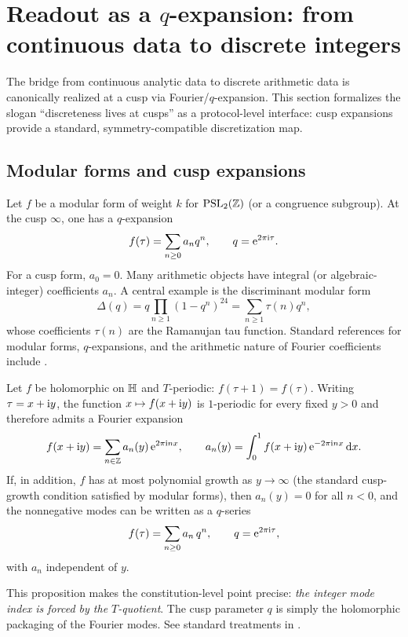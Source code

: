 \section{Readout as a \texorpdfstring{$q$}{q}-expansion: from continuous data to discrete integers}
\label{sec:readout_as_q_expansion}

The bridge from continuous analytic data to discrete arithmetic data is canonically realized at a cusp via Fourier/$q$-expansion. This section formalizes the slogan ``discreteness lives at cusps'' as a protocol-level interface: cusp expansions provide a standard, symmetry-compatible discretization map.

\subsection{Modular forms and cusp expansions}
\label{sec:modular_forms_qexp}

Let $f$ be a modular form of weight $k$ for $\mathrm{PSL}_2(\mathbb{Z})$ (or a congruence subgroup). At the cusp $\infty$, one has a $q$-expansion
\begin{equation}
f(\tau)=\sum_{n\ge 0} a_n q^n,\qquad q=\mathrm{e}^{2\pi \mathrm{i} \tau}.
\end{equation}
For a cusp form, $a_0=0$. Many arithmetic objects have integral (or algebraic-integer) coefficients $a_n$. A central example is the discriminant modular form
\begin{equation}
\Delta(q)=q\prod_{n\ge 1}(1-q^n)^{24}=\sum_{n\ge 1}\tau(n)q^n,
\end{equation}
whose coefficients $\tau(n)$ are the Ramanujan tau function.
Standard references for modular forms, $q$-expansions, and the arithmetic nature of Fourier coefficients include \cite{Serre1973,Apostol1990,DiamondShurman2005}.

\begin{proposition}
\label{prop:qexp_from_T_periodicity}
Let $f$ be holomorphic on $\mathbb{H}$ and $T$-periodic: $f(\tau+1)=f(\tau)$. Writing $\tau=x+\mathrm{i} y$, the function $x\mapsto f(x+\mathrm{i} y)$ is $1$-periodic for every fixed $y>0$ and therefore admits a Fourier expansion
\begin{equation}
f(x+\mathrm{i} y)=\sum_{n\in\mathbb{Z}} a_n(y)\,\mathrm{e}^{2\pi \mathrm{i} n x},
\qquad
a_n(y)=\int_0^1 f(x+\mathrm{i} y)\,\mathrm{e}^{-2\pi \mathrm{i} n x}\,\mathrm{d} x.
\end{equation}
If, in addition, $f$ has at most polynomial growth as $y\to\infty$ (the standard cusp-growth condition satisfied by modular forms), then $a_n(y)=0$ for all $n<0$, and the nonnegative modes can be written as a $q$-series
\begin{equation}
f(\tau)=\sum_{n\ge 0} a_n\,q^n,
\qquad q=\mathrm{e}^{2\pi\mathrm{i}\tau},
\end{equation}
with $a_n$ independent of $y$.
\end{proposition}
\begin{remark}
This proposition makes the constitution-level point precise: \emph{the integer mode index is forced by the $T$-quotient}. The cusp parameter $q$ is simply the holomorphic packaging of the Fourier modes. See standard treatments in \cite{Apostol1990,Serre1973}.
\end{remark}

